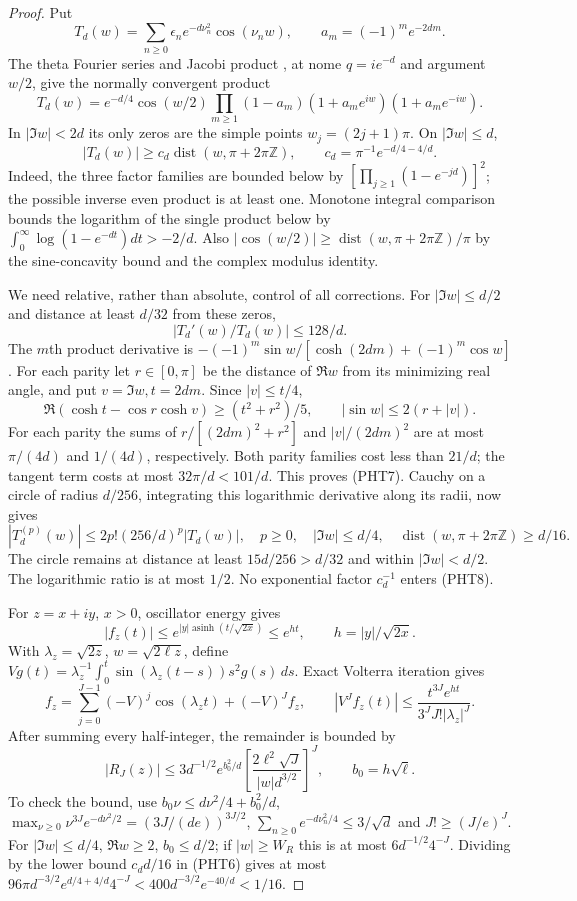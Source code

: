 \documentclass[11pt]{article}
\theoremstyle{remark}\newtheorem{remark}[theorem]{Remark}
\begin{document}
\begin{proof}
Put
\[
 T_d(w)=\sum_{n\ge0}\epsilon_ne^{-d\nu_n^2}\cos(\nu_nw),
 \qquad a_m=(-1)^me^{-2dm}.
\]
The theta Fourier series and Jacobi product
\cite[20.2.2, 20.5.2]{DLMF}, at nome $q=ie^{-d}$ and argument $w/2$,
give the normally convergent product
\[
 T_d(w)=e^{-d/4}\cos(w/2)
       \prod_{m\ge1}(1-a_m)(1+a_me^{iw})(1+a_me^{-iw}).    \tag{PHT5}
\]
In $|\Im w|<2d$ its only zeros are the simple points
$w_j=(2j+1)\pi$. On $|\Im w|\le d$,
\[
 |T_d(w)|\ge c_d\operatorname{dist}(w,\pi+2\pi\mathbb Z),
             \qquad c_d=\pi^{-1}e^{-d/4-4/d}.             \tag{PHT6}
\]
Indeed, the three factor families are bounded below by
$[\prod_{j\ge1}(1-e^{-jd})]^2$; the possible inverse even
product is at least one. Monotone integral comparison bounds the
logarithm of the single product below by
$\int_0^\infty\log(1-e^{-dt})dt>-2/d$.
Also $|\cos(w/2)|\ge\operatorname{dist}(w,\pi+2\pi\mathbb Z)/\pi$
by the sine-concavity bound and the complex modulus identity.

We need relative, rather than absolute, control of all corrections.
For $|\Im w|\le d/2$ and distance at least $d/32$ from these zeros,
\[
                         |T_d'(w)/T_d(w)|\le128/d.       \tag{PHT7}
\]
The $m$th product derivative is
$-(-1)^m\sin w/[\cosh(2dm)+(-1)^m\cos w]$.
For each parity let $r\in[0,\pi]$ be the distance of $\Re w$
from its minimizing real angle, and put $v=\Im w,t=2dm$.
Since $|v|\le t/4$,
\[
 \Re(\cosh t-\cos r\cosh v)\ge(t^2+r^2)/5,\qquad
 |\sin w|\le2(r+|v|).
\]
For each parity the sums of
$r/[(2dm)^2+r^2]$ and $|v|/(2dm)^2$ are at most
$\pi/(4d)$ and $1/(4d)$, respectively.
Both parity families cost less than $21/d$; the tangent term
costs at most $32\pi/d<101/d$. This proves (PHT7).
Cauchy on a circle of radius $d/256$, integrating this logarithmic
derivative along its radii, now gives
\[
 |T_d^{(p)}(w)|\le2p!(256/d)^p|T_d(w)|,\quad p\ge0,
 \quad |\Im w|\le d/4,\quad
 \operatorname{dist}(w,\pi+2\pi\mathbb Z)\ge d/16.         \tag{PHT8}
\]
The circle remains at distance at least $15d/256>d/32$ and
within $|\Im w|<d/2$. The logarithmic ratio is at most $1/2$.
No exponential factor $c_d^{-1}$ enters (PHT8).

For $z=x+iy$, $x>0$, oscillator energy gives
\[
 |f_z(t)|\le e^{|y|\operatorname{asinh}(t/\sqrt{2x})}
                         \le e^{ht},\qquad h=|y|/\sqrt{2x}.
\]
With $\lambda_z=\sqrt{2z}$, $w=\sqrt{2\ell z}$, define
$Vg(t)=\lambda_z^{-1}\int_0^t\sin(\lambda_z(t-s))s^2g(s)\,ds$.
Exact Volterra iteration gives
\[
 f_z=\sum_{j=0}^{J-1}(-V)^j\cos(\lambda_z t)+(-V)^Jf_z,\qquad
 |V^Jf_z(t)|\le\frac{t^{3J}e^{ht}}{3^JJ!|\lambda_z|^J}.
\]
After summing every half-integer, the remainder is bounded by
\[
 |R_J(z)|\le3d^{-1/2}e^{b_0^2/d}
       \left[\frac{2\ell^2\sqrt J}{|w|d^{3/2}}\right]^J,
                  \qquad b_0=h\sqrt\ell.                \tag{PHT9}
\]
To check the bound, use
$b_0\nu\le d\nu^2/4+b_0^2/d$,
$\max_{\nu\ge0}\nu^{3J}e^{-d\nu^2/2}=(3J/(de))^{3J/2}$,
$\sum_{n\ge0}e^{-d\nu_n^2/4}\le3/\sqrt d$ and
$J!\ge(J/e)^J$. For $|\Im w|\le d/4$, $\Re w\ge2$,
$b_0\le d/2$; if $|w|\ge W_R$ this is at most
$6d^{-1/2}4^{-J}$. Dividing by the lower bound $c_dd/16$
in (PHT6) gives at most
$96\pi d^{-3/2}e^{d/4+4/d}4^{-J}
 <400d^{-3/2}e^{-40/d}<1/16$.


\end{proof}
\end{document}
